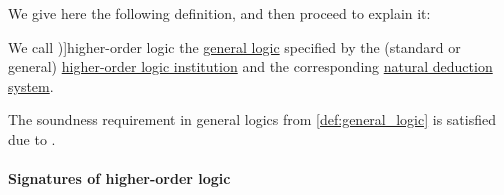 We give here the following definition, and then proceed to explain it:
\begin{definition}\label{def:higher_order_logic}\mimprovised
  We call \term[en=higher-order logic (\cite[267]{Farmer2008STTVirtues})]{higher-order logic} the \hyperref[def:general_logic]{general logic} specified by the (standard or general) \hyperref[def:hol_institution]{higher-order logic institution} and the corresponding \hyperref[def:hol_natural_deduction]{natural deduction system}.
\end{definition}
\begin{comments}
  \item The soundness requirement in general logics from \cref{def:general_logic} is satisfied due to .
\end{comments}

\paragraph{Signatures of higher-order logic}

